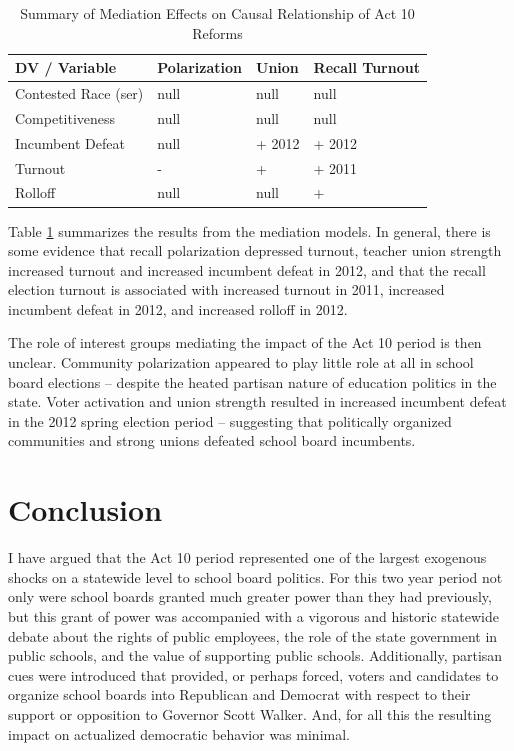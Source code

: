 \begin{table}[h!]
\begin{center}
\caption{Summary of Mediation Effects on Causal Relationship of Act 10 Reforms}
\label{tab:act10medSummary}
\begin{footnotesize}
\begin{tabular}{| p{} | p{} | p{} | 
      p{} |} \hline
DV / Variable & Polarization &  Union & Recall Turnout \\ \hline
Contested Race (ser) & null & null   & null \\ \hline
Competitiveness      & null & null   & null \\ \hline
Incumbent Defeat     & null & + 2012 & + 2012 \\ \hline 
Turnout              & -    & +      & + 2011 \\ \hline
Rolloff              & null & null   & + \\ \hline
\end{tabular}
\end{footnotesize}
\end{center}
\end{table}

Table \ref{tab:act10medSummary} summarizes the results from the mediation models. 
In general, there is some evidence that recall polarization depressed turnout, 
teacher union strength increased turnout and increased incumbent defeat in 2012, 
and that the recall election turnout is associated with increased turnout in 
2011, increased incumbent defeat in 2012, and increased rolloff in 2012. 

The role of interest groups mediating the impact of the Act 10 period is then 
unclear. Community polarization appeared to play little role at all in school 
board elections -- despite the heated partisan nature of education politics in the 
state. Voter activation and union strength resulted in increased incumbent 
defeat in the 2012 spring election period -- suggesting that politically organized 
communities and strong unions defeated school board incumbents. 

\clearpage 

\section{Conclusion}

I have argued that the Act 10 period represented one of the largest exogenous 
shocks on a statewide level to school board politics. For this two year period 
not only were school boards granted much greater power than they had previously, 
but this grant of power was accompanied with a vigorous and historic statewide 
debate about the rights of public employees, the role of the state government 
in public schools, and the value of supporting public schools. Additionally, 
partisan cues were introduced that provided, or perhaps forced, voters and 
candidates to organize school boards into Republican and Democrat with respect 
to their support or opposition to Governor Scott Walker. And, for all this the 
resulting impact on actualized democratic behavior was minimal.


